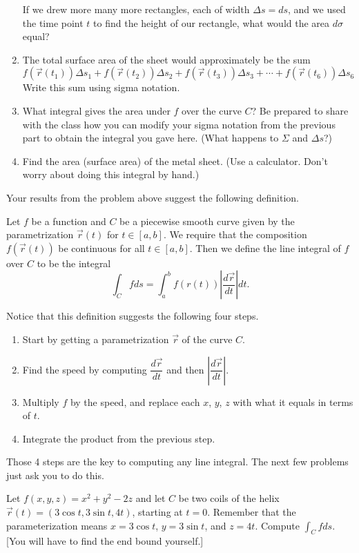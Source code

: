 \begin{problem}
\begin{enumerate}
If we drew more many more rectangles, each of width $\Delta s=ds$, and we used the time point $t$ to find the height of our rectangle, what would the area $d\sigma$ equal?

 \item The total surface area of the sheet would approximately be the sum
$$
f(\vec r(t_1))\Delta s_1+
f(\vec r(t_2))\Delta s_2+
f(\vec r(t_3))\Delta s_3+\cdots+
f(\vec r(t_6))\Delta s_6
$$
Write this sum using sigma notation. 
\item What integral gives the area under $f$ over the curve $C$? Be prepared to share with the class how you can modify your sigma notation from the previous part to obtain the integral you gave here. (What happens to $\Sigma$ and $\Delta s$?)
\item Find the area (surface area) of the metal sheet. (Use a calculator. Don't worry about doing this integral by hand.)
\end{enumerate}
\end{problem}

Your results from the problem above suggest the following definition.
\begin{definition}%
 Let $f$ be a function and $C$ be a piecewise smooth curve given by the parametrization $\vec r(t)$ for $t\in[a,b]$. We require that the composition $f(\vec r(t))$ be continuous for all $t\in [a,b]$. Then we define the line integral
of $f$ over $C$ to be the integral 
$$\int_C f ds = \int_a^b f(r(t))\left|\frac{d\vec r}{dt}\right|dt.$$
\end{definition}

Notice that this definition suggests the following four steps.
\begin{enumerate}
 \item Start by getting a parametrization $\vec r$ of the curve $C$. 
 \item Find the speed by computing $\dfrac{d\vec r}{dt}$ and then $\left|\dfrac{d\vec r}{dt}\right|$.
 \item Multiply $f$ by the speed, and replace each $x$, $y$, $z$ with what it equals in terms of $t$.
 \item Integrate the product from the previous step.
\end{enumerate}
Those 4 steps are the key to computing any line integral.  The next few problems just ask you to do this.


\begin{problem}%
 Let $f(x,y,z)=x^2+y^2-2z$ and let $C$ be two coils of the helix $\vec r(t)=(3\cos t, 3\sin t, 4t)$, starting at $t=0$. Remember that the parameterization means $x=3\cos t$, $y=3\sin t$, and $z=4t$.  Compute  $\int_Cf ds$. [You will have to find the end bound yourself.]
\end{problem}

